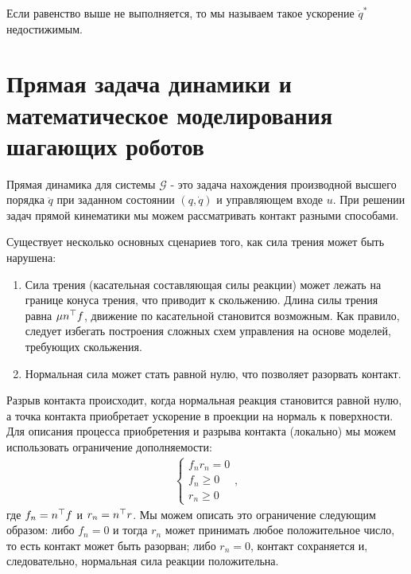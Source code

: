 \bigskip

Если равенство выше не выполняется, то мы называем такое ускорение $\ddot{{q}}^*$ недостижимым.

\section{Прямая задача динамики и математическое моделирования шагающих роботов}\label{sec:ch2/sect5}
Прямая динамика для системы $\mathcal{G}$ - это задача нахождения производной высшего порядка $\ddot{{q}}$ при заданном состоянии $({q}, \dot{{q}})$ и управляющем входе ${u}$. При решении задач прямой кинематики мы можем рассматривать контакт разными способами.

Существует несколько основных сценариев того, как сила трения может быть нарушена:
%
\begin{enumerate}
	\item Сила трения (касательная составляющая силы реакции) может лежать на границе конуса трения, что приводит к скольжению. Длина силы трения равна $\mu {n}^\top {f}$, движение по касательной становится возможным. Как правило, следует избегать построения сложных схем управления на основе моделей, требующих скольжения.
	\item Нормальная сила может стать равной нулю, что позволяет разорвать контакт.
\end{enumerate}

Разрыв контакта происходит, когда нормальная реакция становится равной нулю, а точка контакта приобретает ускорение в проекции на нормаль к поверхности.
%
Для описания процесса приобретения и разрыва контакта (локально) мы можем использовать ограничение дополняемости:
%
\begin{align}
	\label{eq:part2_cond}
	\begin{cases}
		f_n r_n = 0 \\
		f_n \geq 0 \\
		r_n \geq 0
	\end{cases},
\end{align}
где $f_n = {n}^\top{f}$ и $r_n ={n}^\top{r}$. Мы можем описать это ограничение следующим образом: либо $f_n = 0$ и тогда $r_n$ может принимать любое положительное число, то есть контакт может быть разорван; либо $r_n = 0$, контакт сохраняется и, следовательно, нормальная сила реакции положительна.

